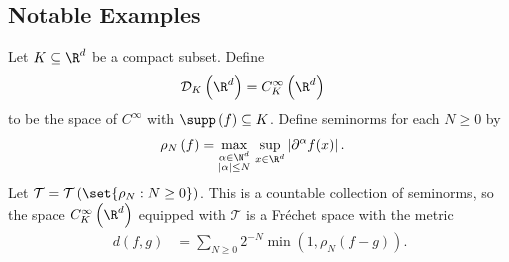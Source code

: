 \documentclass[10pt]{mypackage}
\begin{document}
\subsection{Notable Examples}%
\begin{example}
  Let $K\subseteq \R^d$ be a compact subset. Define
  \begin{align*}
    \mathcal{D}_K\left( \R^d \right) &= C_{K}^{\infty} \left( \R^{d} \right)
  \end{align*}
  to be the space of $C^{\infty}$ with $ \supp\left( f \right)\subseteq K $. Define seminorms for each $N\geq 0$ by
  \begin{align*}
    \rho_{N}\left(f\right) &= \max_{\substack{\alpha\in \N^d\\\left\vert \alpha \right\vert\leq N}} \,\sup_{x\in \R^d} \left\vert \partial^{\alpha}f(x) \right\vert.
  \end{align*}
  Let $ \mathcal{T} = \mathcal{T}\left( \set{\rho_N : N\geq 0} \right) $. This is a countable collection of seminorms, so the space $C_K^{\infty}\left( \R^d \right)$ equipped with $ \mathcal{T} $ is a Fréchet space with the metric
  \begin{align*}
    d\left( f,g \right) &= \sum_{N\geq 0} 2^{-N} \min\left( 1, \rho_N\left( f-g \right) \right).
  \end{align*}
\end{example}
\end{document}
